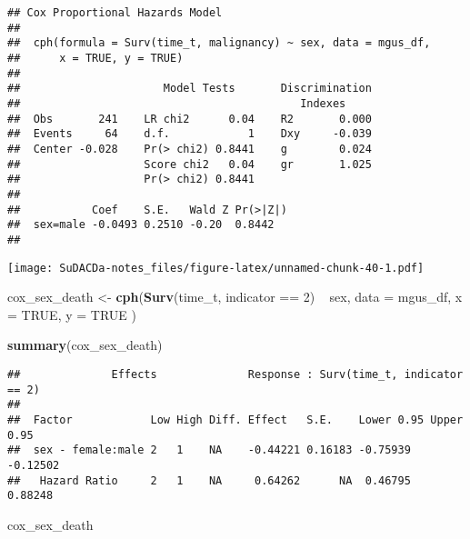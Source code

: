 \documentclass[]{book}
\newenvironment{Shaded}{\begin{snugshade}}{\end{snugshade}}
\newcommand{\KeywordTok}[1]{\textcolor[rgb]{0.13,0.29,0.53}{\textbf{{#1}}}}
\newcommand{\DataTypeTok}[1]{\textcolor[rgb]{0.13,0.29,0.53}{{#1}}}
\newcommand{\DecValTok}[1]{\textcolor[rgb]{0.00,0.00,0.81}{{#1}}}
\newcommand{\StringTok}[1]{\textcolor[rgb]{0.31,0.60,0.02}{{#1}}}
\newcommand{\CommentTok}[1]{\textcolor[rgb]{0.56,0.35,0.01}{\textit{{#1}}}}
\newcommand{\OtherTok}[1]{\textcolor[rgb]{0.56,0.35,0.01}{{#1}}}
\newcommand{\NormalTok}[1]{{#1}}
\theoremstyle{definition}
\theoremstyle{definition}
\theoremstyle{definition}
\theoremstyle{remark}
\begin{document}
\begin{verbatim}
## Cox Proportional Hazards Model
##  
##  cph(formula = Surv(time_t, malignancy) ~ sex, data = mgus_df, 
##      x = TRUE, y = TRUE)
##  
##                      Model Tests       Discrimination    
##                                           Indexes        
##  Obs       241    LR chi2      0.04    R2       0.000    
##  Events     64    d.f.            1    Dxy     -0.039    
##  Center -0.028    Pr(> chi2) 0.8441    g        0.024    
##                   Score chi2   0.04    gr       1.025    
##                   Pr(> chi2) 0.8441                      
##  
##           Coef    S.E.   Wald Z Pr(>|Z|)
##  sex=male -0.0493 0.2510 -0.20  0.8442  
## 
\end{verbatim}

\begin{Shaded}
\end{Shaded}

\texttt{[image: SuDACDa-notes\_files/figure-latex/unnamed-chunk-40-1.pdf]}

\begin{Shaded}
\begin{Highlighting}[]
\NormalTok{cox_sex_death <-}\StringTok{ }\KeywordTok{cph}\NormalTok{(}\KeywordTok{Surv}\NormalTok{(time_t, indicator ==}\StringTok{ }\DecValTok{2}\NormalTok{) ~}\StringTok{ }\NormalTok{sex,}
  \DataTypeTok{data =} \NormalTok{mgus_df,}
  \DataTypeTok{x    =} \OtherTok{TRUE}\NormalTok{,}
  \DataTypeTok{y    =} \OtherTok{TRUE}
\NormalTok{)}

\KeywordTok{summary}\NormalTok{(cox_sex_death)}
\end{Highlighting}
\end{Shaded}

\begin{verbatim}
##              Effects              Response : Surv(time_t, indicator == 2) 
## 
##  Factor            Low High Diff. Effect   S.E.    Lower 0.95 Upper 0.95
##  sex - female:male 2   1    NA    -0.44221 0.16183 -0.75939   -0.12502  
##   Hazard Ratio     2   1    NA     0.64262      NA  0.46795    0.88248
\end{verbatim}

\begin{Shaded}
\begin{Highlighting}[]
\NormalTok{cox_sex_death}
\end{Highlighting}
\end{Shaded}
\end{document}
